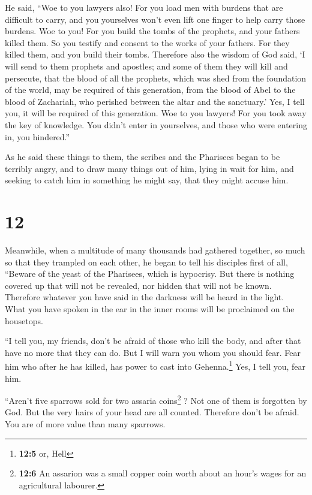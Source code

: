  He said, ``Woe to you lawyers also! For you load men
with burdens that are difficult to carry, and you yourselves won't even
lift one finger to help carry those burdens.  Woe to you!
For you build the tombs of the prophets, and your fathers killed them.
 So you testify and consent to the works of your fathers.
For they killed them, and you build their tombs. 
Therefore also the wisdom of God said, `I will send to them prophets and
apostles; and some of them they will kill and persecute, 
that the blood of all the prophets, which was shed from the foundation
of the world, may be required of this generation,  from
the blood of Abel to the blood of Zachariah, who perished between the
altar and the sanctuary.' Yes, I tell you, it will be required of this
generation.  Woe to you lawyers! For you took away the
key of knowledge. You didn't enter in yourselves, and those who were
entering in, you hindered.''

 As he said these things to them, the scribes and the
Pharisees began to be terribly angry, and to draw many things out of
him,  lying in wait for him, and seeking to catch him in
something he might say, that they might accuse him.

\hypertarget{section-11}{%
\section{12}\label{section-11}}

 Meanwhile, when a multitude of many thousands had
gathered together, so much so that they trampled on each other, he began
to tell his disciples first of all, ``Beware of the yeast of the
Pharisees, which is hypocrisy.  But there is nothing
covered up that will not be revealed, nor hidden that will not be known.
 Therefore whatever you have said in the darkness will be
heard in the light. What you have spoken in the ear in the inner rooms
will be proclaimed on the housetops.

 ``I tell you, my friends, don't be afraid of those who
kill the body, and after that have no more that they can do.
 But I will warn you whom you should fear. Fear him who
after he has killed, has power to cast into Gehenna.\footnote{\textbf{12:5}
  or, Hell} Yes, I tell you, fear him.

 ``Aren't five sparrows sold for two assaria
coins\footnote{\textbf{12:6} An assarion was a small copper coin worth
  about an hour's wages for an agricultural labourer.} ? Not one of them
is forgotten by God.  But the very hairs of your head are
all counted. Therefore don't be afraid. You are of more value than many
sparrows.

